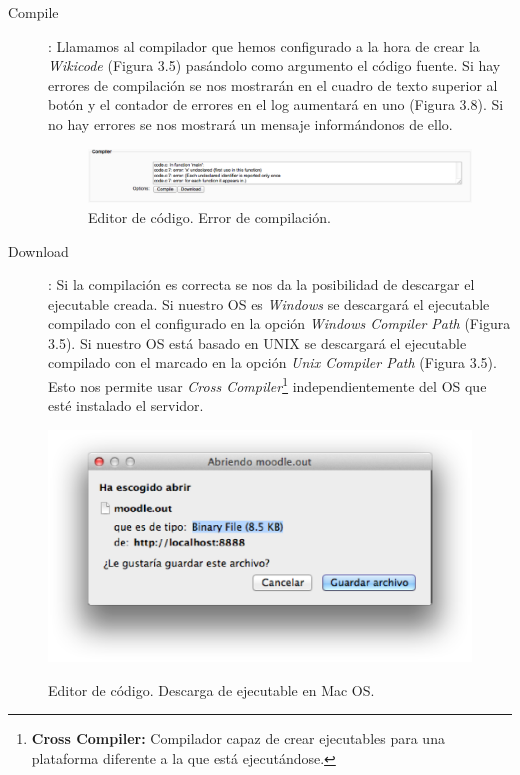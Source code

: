 \begin{description}
	\item[Compile]: Llamamos al compilador que hemos configurado a la hora de crear la \emph{Wikicode} (Figura 3.5) pasándolo como argumento el código fuente. Si hay errores de compilación se nos mostrarán en el cuadro de texto superior al botón y el contador de errores en el log aumentará en uno (Figura 3.8). Si no hay errores se nos mostrará un mensaje informándonos de ello.
	
	\begin{figure}[h]
		\label{fig:ecompile1}
		\includegraphics[width=\textwidth]{./img/ecompile1.eps}
		\caption{Editor de código. Error de compilación.}
	\end{figure}
	
	\item[Download]: Si la compilación es correcta se nos da la posibilidad de descargar el ejecutable creada. Si nuestro OS es \emph{Windows} se descargará el ejecutable compilado con el configurado en la opción \emph{Windows Compiler Path} (Figura 3.5). Si nuestro OS está basado en UNIX se descargará el ejecutable compilado con el marcado en la opción \emph{Unix Compiler Path} (Figura 3.5). Esto nos permite usar \emph{Cross Compiler}\footnote{\textbf{Cross Compiler:} Compilador capaz de crear ejecutables para una plataforma diferente a la que está ejecutándose.} independientemente del OS que esté instalado el servidor.
\end{description}

\begin{figure}[h]
	\begin{center}
	\label{fig:ecompile}
	\includegraphics[scale=0.40]{./img/ecompile.eps}
	\caption{Editor de código. Descarga de ejecutable en Mac OS.}
	\end{center}
\end{figure}
















	
